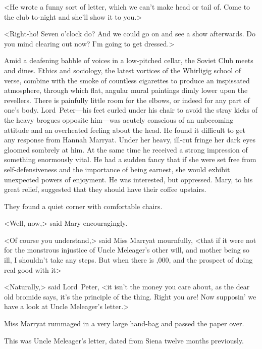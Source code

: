 <He wrote a funny sort of letter, which we can't make head or tail of. Come to the club to-night and she'll show it to you.>

<Right-ho! Seven o'clock do? And we could go on and see a show afterwards. Do you mind clearing out now? I'm going to get dressed.>

\divider
Amid a deafening babble of voices in a low-pitched cellar, the Soviet Club meets and dines. Ethics and sociology, the latest vortices of the Whirligig school of verse, combine with the smoke of countless cigarettes to produce an inspissated atmosphere, through which flat, angular mural paintings dimly lower upon the revellers. There is painfully little room for the elbows, or indeed for any part of one's body. Lord~Peter—his feet curled under his chair to avoid the stray kicks of the heavy brogues opposite him—was acutely conscious of an unbecoming attitude and an overheated feeling about the head. He found it difficult to get any response from Hannah Marryat. Under her heavy, ill-cut fringe her dark eyes gloomed sombrely at him. At the same time he received a strong impression of something enormously vital. He had a sudden fancy that if she were set free from self-defensiveness and the importance of being earnest, she would exhibit unexpected powers of enjoyment. He was interested, but oppressed. Mary, to his great relief, suggested that they should have their coffee upstairs.

They found a quiet corner with comfortable chairs.

<Well, now,> said Mary encouragingly.

<Of course you understand,> said Miss Marryat mournfully, <that if it were not for the monstrous injustice of Uncle Meleager's other will, and mother being so ill, I shouldn't take any steps. But when there is ,000, and the prospect of doing real good with it\longdash>

<Naturally,> said Lord~Peter, <it isn't the money you care about, as the dear old bromide says, it's the principle of the thing. Right you are! Now supposin' we have a look at Uncle Meleager's letter.>

Miss Marryat rummaged in a very large hand-bag and passed the paper over.

This was Uncle Meleager's letter, dated from Siena twelve months previously.

\begin{letter}
	\enlargethispage{\baselineskip}
\end{letter}


